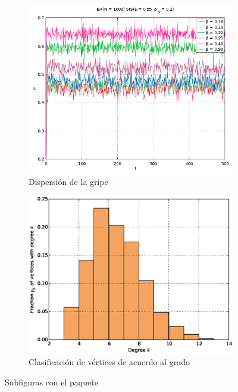 \documentclass{article}
\begin{document}
\begin{figure}[ht]
	\centering
    \begin{subfigure}[t]{.475\textwidth}
    	\centering
    	\includegraphics[scale = .45]{BA_1000_u055_p_t_}
        \caption{Dispersión de la gripe}
    \end{subfigure}
    \hfill
    \begin{subfigure}[t]{.45\textwidth}
        \centering
        \includegraphics[scale = .35]{histws1000}
        \caption{Clasificación de vértices de acuerdo al grado}
    \end{subfigure}
    \caption{Subfiguras con el paquete }
\end{figure}
\end{document}
